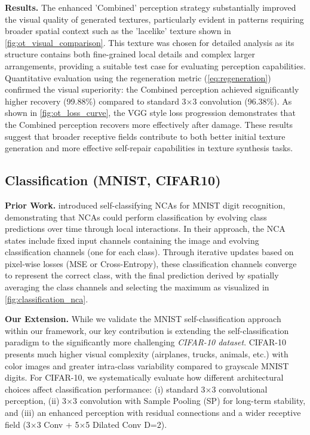 \documentclass[10pt]{article} %
\begin{document}
\noindent\textbf{Results.}
The enhanced 'Combined' perception strategy substantially improved the visual quality of generated textures, particularly evident in patterns requiring broader spatial context such as the 'lacelike' texture shown in \cref{fig:ot_visual_comparison}. This texture was chosen for detailed analysis as its structure contains both fine-grained local details and complex larger arrangements, providing a suitable test case for evaluating perception capabilities. Quantitative evaluation using the regeneration metric (\cref{eq:regeneration}) confirmed the visual superiority: the Combined perception achieved significantly higher recovery (99.88\%) compared to standard 3×3 convolution (96.38\%). As shown in \cref{fig:ot_loss_curve}, the VGG style loss progression demonstrates that the Combined perception recovers more effectively after damage. These results suggest that broader receptive fields contribute to both better initial texture generation and more effective self-repair capabilities in texture synthesis tasks.

\subsection{Classification (MNIST, CIFAR10)}
\label{sec:classification}

\noindent\textbf{Prior Work.}
\citep{randazzo2020self-classifying} introduced self-classifying NCAs for MNIST digit recognition, demonstrating that NCAs could perform classification by evolving class predictions over time through local interactions. In their approach, the NCA states include fixed input channels containing the image and evolving classification channels (one for each class). Through iterative updates based on pixel-wise losses (MSE or Cross-Entropy), these classification channels converge to represent the correct class, with the final prediction derived by spatially averaging the class channels and selecting the maximum as visualized in \cref{fig:classification_nca}.

\noindent\textbf{Our Extension.}
While we validate the MNIST self-classification approach within our framework, our key contribution is extending the self-classification paradigm to the significantly more challenging \textit{CIFAR-10 dataset}. CIFAR-10 presents much higher visual complexity (airplanes, trucks, animals, etc.) with color images and greater intra-class variability compared to grayscale MNIST digits. For CIFAR-10, we systematically evaluate how different architectural choices affect classification performance: (i) standard 3×3 convolutional perception, (ii) 3×3 convolution with Sample Pooling (SP) for long-term stability, and (iii) an enhanced perception with residual connections and a wider receptive field (3×3 Conv + 5×5 Dilated Conv D=2). 
\end{document}
